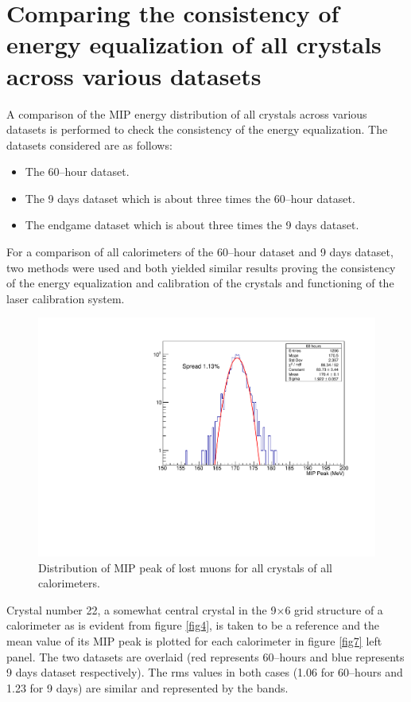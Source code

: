 \documentclass[article,accept,moreauthors,pdftex,10pt,a4paper]{../MDPI_template/Definitions/mdpi}
\begin{document}
\section{Comparing the consistency of energy equalization of all crystals across various datasets}
\noindent A comparison of the MIP energy distribution of all crystals across various datasets is 
performed to check the consistency of the energy equalization. 
The datasets considered are as follows:
\begin{itemize} 
\item The 60--hour dataset.
\item The 9 days dataset which is about three times the 60--hour dataset.
\item The endgame dataset which is about three times the 9 days dataset.
\end{itemize} 

For a comparison of all calorimeters of the 60--hour dataset and 9 days dataset, two methods were used and both 
yielded similar results proving the consistency of the energy equalization and calibration of the crystals 
and functioning of the laser calibration system.
\begin{figure}[H]
\centering
\includegraphics[width=7.2 cm]{all_xtal_1.pdf}
\caption{\label{fig5}Distribution of MIP peak of lost muons for all crystals of all calorimeters. }
\end{figure}


Crystal number 22, a somewhat central crystal in the 9$\times$6 
grid structure of a calorimeter as is evident from figure \ref{fig4}, is taken to be a reference and the mean value of 
its MIP peak is plotted for each calorimeter in figure \ref{fig7} left panel. The two datasets are overlaid 
(red represents 60--hours and blue represents 9 days dataset respectively). The rms 
values in both cases (1.06 for 60--hours and 1.23 for 9 days) are similar and represented by the bands. 
\end{document}

